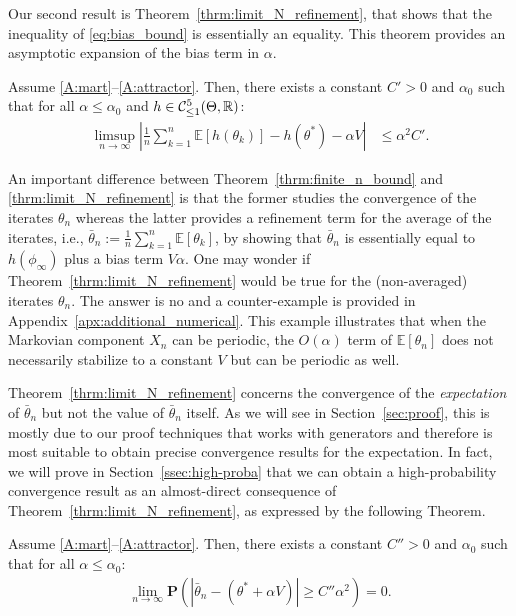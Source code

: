 \documentclass{article}
\newcommand{\R}{\mathbb{R}}
\newcommand\Proba[1]{\mathbf{P}\left(#1\right)}
\newcommand\E{\mathbb{E}}
\newcommand\esp[1]{\E\left[#1\right]}
\newcommand\abs[1]{\left|#1\right|}
\newcommand\cont[3][]{\mathcal{C}^{#2}_{\ifthenelse{\equal{#1}{all}}{}{\le1}}(#3,\R)}
\begin{document}
Our second result is Theorem~\ref{thrm:limit_N_refinement}, that shows that the inequality of \eqref{eq:bias_bound} is essentially an equality. This theorem provides an asymptotic expansion of the bias term in $\alpha$. 
\begin{theorem} \label{thrm:limit_N_refinement} 
    Assume \ref{A:mart}--\ref{A:attractor}. Then, there exists a constant $C'>0$ and $\alpha_0$ such that for all $\alpha\le\alpha_0$ and $h\in\cont{5}{\Theta}$:
    \begin{align}
        \limsup_{n\to\infty}\abs{\frac{1}{n}\sum_{k=1}^{n}\esp{h(\theta_{k})} - h(\theta^*) - \alpha V} & \leq \alpha^2 C'. \label{eq:refinement_statement_accuracy_lim_N}
    \end{align}
\end{theorem}
An important difference between Theorem~\ref{thrm:finite_n_bound} and \ref{thrm:limit_N_refinement} is that the former studies the convergence of the iterates $\theta_n$ whereas the latter provides a refinement term for the average of the iterates, i.e., $\bar{\theta}_n := \frac{1}{n}\sum_{k=1}^n \esp{\theta_k}$, by showing that $\bar{\theta}_n$ is essentially equal to $h(\phi_\infty)$ plus a bias term $V\alpha$.  One may wonder if Theorem~\ref{thrm:limit_N_refinement} would be true for the (non-averaged) iterates $\theta_n$. The answer is no and a counter-example is provided in Appendix~\ref{apx:additional_numerical}. This example illustrates that when the Markovian component $X_n$ can be periodic, the $O(\alpha)$ term of $\esp{\theta_n}$ does not necessarily stabilize to a constant $V$ but can be periodic as well.

Theorem~\ref{thrm:limit_N_refinement} concerns the convergence of the \emph{expectation} of $\bar{\theta}_n$ but not the value of $\bar{\theta}_n$ itself. As we will see in Section~\ref{sec:proof}, this is mostly due to our proof techniques that works with generators and therefore is most suitable to obtain precise convergence results for the expectation. In fact, we will prove in Section~\ref{ssec:high-proba} that we can obtain a high-probability convergence result as an almost-direct consequence of Theorem~\ref{thrm:limit_N_refinement}, as expressed by the following Theorem.

\begin{theorem} \label{thrm:limit_N_refinement_proba} 
    Assume \ref{A:mart}--\ref{A:attractor}. Then, there exists a constant $C''>0$ and $\alpha_0$ such that for all $\alpha\le\alpha_0$:
    \begin{align*}
        \lim_{n\to\infty} \Proba{\abs{\bar{\theta}_n - (\theta^* + \alpha V)} \ge C''\alpha^2} = 0. 
    \end{align*}
\end{theorem}
\end{document}
